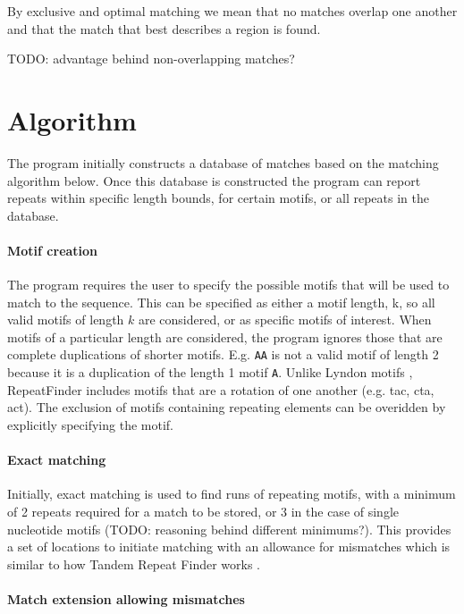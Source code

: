 \documentclass[a4paper]{article}
\begin{document}
By exclusive and optimal matching we mean that no matches overlap one another and that the match that best describes a region is found.

TODO: advantage behind non-overlapping matches?

\section{Algorithm}

The program initially constructs a database of matches based on the matching algorithm below. Once this database is constructed the program can report repeats within specific length bounds, for certain motifs, or all repeats in the database.

\paragraph{Motif creation}

The program requires the user to specify the possible motifs that will be used to match to the sequence. This can be specified as either a motif length, k, so all valid motifs of length $k$ are considered, or as specific motifs of interest. When motifs of a particular length are considered, the program ignores those that are complete duplications of shorter motifs. E.g. \texttt{AA} is not a valid motif of length 2 because it is a duplication of the length 1 motif \texttt{A}. Unlike Lyndon motifs \cite{Delgrange04}, RepeatFinder includes motifs that are a rotation of one another (e.g. tac, cta, act). The exclusion of motifs containing repeating elements can be overidden by explicitly specifying the motif.

\paragraph{Exact matching}

Initially, exact matching is used to find runs of repeating motifs, with a minimum of 2 repeats required for a match to be stored, or 3 in the case of single nucleotide motifs (TODO: reasoning behind different minimums?). This provides a set of locations to initiate matching with an allowance for mismatches which is similar to how Tandem Repeat Finder works \cite{Benson99}.

\paragraph{Match extension allowing mismatches}
\end{document}
